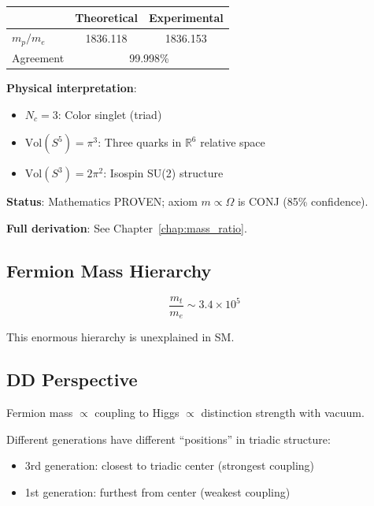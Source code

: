 \begin{center}
\begin{tabular}{lcc}
\hline
& Theoretical & Experimental \\
\hline
$m_p/m_e$ & 1836.118 & 1836.153 \\
\hline
Agreement & \multicolumn{2}{c}{99.998\%} \\
\hline
\end{tabular}
\end{center}

\textbf{Physical interpretation}:
\begin{itemize}
    \item $N_c = 3$: Color singlet (triad)
    \item $\text{Vol}(S^5) = \pi^3$: Three quarks in $\mathbb{R}^6$ relative space
    \item $\text{Vol}(S^3) = 2\pi^2$: Isospin SU(2) structure
\end{itemize}

\textbf{Status}: Mathematics PROVEN; axiom $m \propto \Omega$ is CONJ (85\% confidence).

\textbf{Full derivation}: See Chapter~\ref{chap:mass_ratio}.

\subsection{Fermion Mass Hierarchy}

\begin{equation}
\frac{m_t}{m_e} \sim 3.4 \times 10^5
\end{equation}

This enormous hierarchy is unexplained in SM.

\subsection{DD Perspective}

\begin{theorem}
Fermion mass $\propto$ coupling to Higgs $\propto$ distinction strength with vacuum.
\end{theorem}

Different generations have different ``positions'' in triadic structure:
\begin{itemize}
    \item 3rd generation: closest to triadic center (strongest coupling)
    \item 1st generation: furthest from center (weakest coupling)
\end{itemize}


